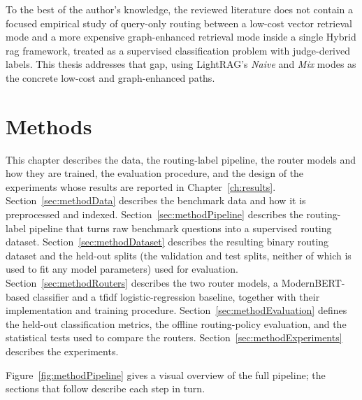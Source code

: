 \documentclass[english, bibtex]{kththesis}               %
\numberwithin{listing}{chapter}
\begin{document}
To the best of the author's knowledge, the reviewed literature does not contain a focused empirical study of query-only routing between a low-cost vector retrieval mode and a more expensive graph-enhanced retrieval mode inside a single Hybrid \gls{rag} framework, treated as a supervised classification problem with judge-derived labels. This thesis addresses that gap, using LightRAG's \emph{Naive} and \emph{Mix} modes as the concrete low-cost and graph-enhanced paths.

\cleardoublepage
\chapter{Methods}
\label{ch:methods}

This chapter describes the data, the routing-label pipeline, the router models and how they are trained, the evaluation procedure, and the design of the experiments whose results are reported in Chapter~\ref{ch:results}. Section~\ref{sec:methodData} describes the benchmark data and how it is preprocessed and indexed. Section~\ref{sec:methodPipeline} describes the routing-label pipeline that turns raw benchmark questions into a supervised routing dataset. Section~\ref{sec:methodDataset} describes the resulting binary routing dataset and the held-out splits (the validation and test splits, neither of which is used to fit any model parameters) used for evaluation. Section~\ref{sec:methodRouters} describes the two router models, a ModernBERT-based classifier and a \gls{tfidf} logistic-regression baseline, together with their implementation and training procedure. Section~\ref{sec:methodEvaluation} defines the held-out classification metrics, the offline routing-policy evaluation, and the statistical tests used to compare the routers. Section~\ref{sec:methodExperiments} describes the experiments.

Figure~\ref{fig:methodPipeline} gives a visual overview of the full pipeline; the sections that follow describe each step in turn.
\end{document}

